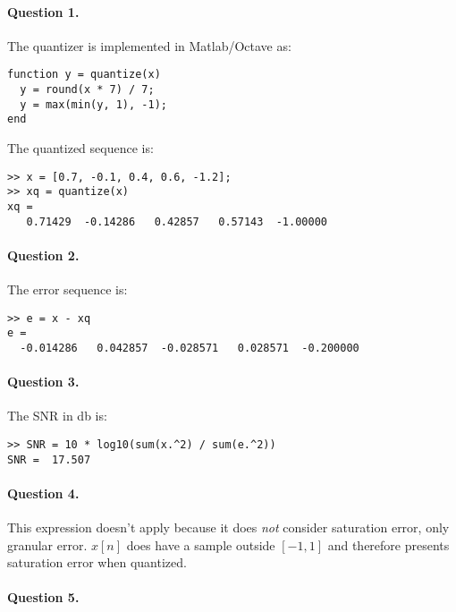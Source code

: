 


\startpage

\paragraph{Question 1.}

The quantizer is implemented in Matlab/Octave as:

\begin{verbatim}
function y = quantize(x)
  y = round(x * 7) / 7;
  y = max(min(y, 1), -1);
end
\end{verbatim}

The quantized sequence is:

\begin{verbatim}
>> x = [0.7, -0.1, 0.4, 0.6, -1.2];
>> xq = quantize(x)
xq =
   0.71429  -0.14286   0.42857   0.57143  -1.00000
\end{verbatim}

\paragraph{Question 2.}

The error sequence is:

\begin{verbatim}
>> e = x - xq
e =
  -0.014286   0.042857  -0.028571   0.028571  -0.200000
\end{verbatim}

\paragraph{Question 3.}

The SNR in \si{\decibel} is:

\begin{verbatim}
>> SNR = 10 * log10(sum(x.^2) / sum(e.^2))
SNR =  17.507
\end{verbatim}

\paragraph{Question 4.}

This expression doesn't apply because it does \emph{not} consider
saturation error, only granular error. $x[n]$ does have a sample outside
$[-1, 1]$ and therefore presents saturation error when quantized.

\paragraph{Question 5.}

